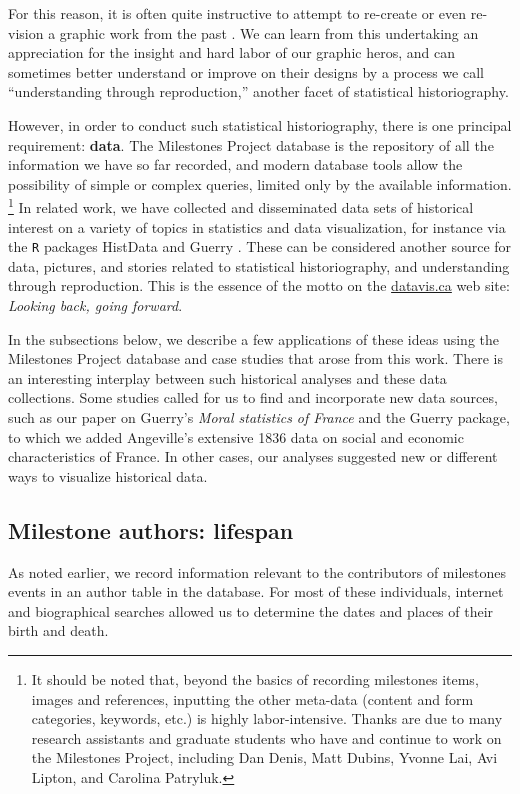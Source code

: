 For this reason, it is often quite instructive to attempt to re-create or even re-vision a graphic work from the past \citep{Friendly:02:Minard}. 
We can learn from this undertaking an appreciation for the insight and hard labor of our graphic heros, and can sometimes better understand 
or improve on their designs by a process we call ``understanding through reproduction,'' another facet of statistical historiography.



However, in order to conduct such statistical historiography, there is one principal requirement: \textbf{data}. The Milestones Project database is the repository of all the information we have so far recorded, and modern database tools allow the possibility of simple or complex queries, limited only by the available information.%
\footnote{It should be noted that, beyond the basics of recording milestones items, images and references, inputting the other meta-data (content and form categories, keywords, etc.) is highly labor-intensive. Thanks are due to many research assistants and graduate students who have and continue to work on the Milestones Project, including Dan Denis, Matt Dubins, Yvonne Lai, Avi Lipton, and Carolina Patryluk.}
In related work, we have collected and disseminated data sets of historical interest on a variety of topics in statistics and data visualization, for instance via the \texttt{R} packages HistData \citep{HistData} and Guerry \citep{Guerry}. These can be considered another source for data, pictures, and stories related to statistical historiography, and understanding through reproduction. This is the essence of the motto on the \url{datavis.ca} web site: \emph{Looking back, going forward}.

In the subsections below, we describe a few applications of these ideas using the Milestones Project database and case studies that arose from this work. There is an interesting interplay between such historical analyses and these data collections. Some studies called for us to find and incorporate new data sources, such as our paper \citep{Friendly:2007:guerry} on Guerry's \emph{Moral statistics of France} and the Guerry package, to which we added Angeville's extensive 1836 data on social and economic characteristics of France. In other cases, our analyses suggested new or different ways to visualize historical data.

\subsection{Milestone authors: lifespan}\label{sec:lifespan}
As noted earlier, we record information relevant to the contributors of milestones events in an author table in the database. For most of these individuals, internet and biographical searches allowed us to determine the dates and places of their birth and death.

